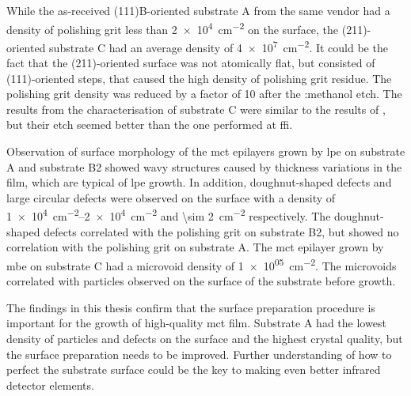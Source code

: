 While the as-received (111)B-oriented substrate A from the same vendor had a density of polishing grit less than \SI{2e4}{\centi\metre^{-2}} on the surface, the (211)-oriented substrate C had an average density of \SI{4e7}{\centi\metre^{-2}}. It could be the fact that the (211)-oriented surface was not atomically flat, but consisted of (111)-oriented steps, that caused the high density of polishing grit residue. The polishing grit density was reduced by a factor of 10 after the :methanol etch. The results from the characterisation of substrate C were similar to the results of \citeauthor{benson2016analysis}, but their etch seemed better than the one performed at \ac{ffi}.

Observation of surface morphology of the \ac{mct} epilayers grown by \ac{lpe} on substrate A and substrate B2 showed wavy structures caused by thickness variations in the film, which are typical of \ac{lpe} growth. In addition, doughnut-shaped defects and large circular defects were observed on the surface with a density of \SIrange{1e4}{2e4}{\centi\metre^{-2}} and \SI{\sim 2}{\centi\metre^{-2}} respectively. The doughnut-shaped defects correlated with the polishing grit on substrate B2, but showed no correlation with the polishing grit on substrate A. The \ac{mct} epilayer grown by \ac{mbe} on substrate C had a microvoid density of \SI{1e+05}{\centi\metre^{-2}}. The microvoids correlated with particles observed on the surface of the substrate before growth.

The findings in this thesis confirm that the surface preparation procedure is important for the growth of high-quality \ac{mct} film. Substrate A had the lowest density of particles and defects on the surface and the highest crystal quality, but the surface preparation needs to be improved. Further understanding of how to perfect the substrate surface could be the key to making even better infrared detector elements.








